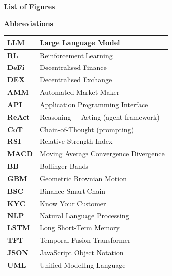 \documentclass[12pt,a4paper,oneside,openany]{book}
\begin{document}
\clearpage
\thispagestyle{empty}
\begin{center}
  {\fontsize{18}{22}\selectfont\bfseries List of Figures}
\end{center}
\vspace{8mm}
\makeatletter
{}
\makeatother
\thispagestyle{empty}

\clearpage
\thispagestyle{empty}
\begin{center}
  {\fontsize{16}{18}\selectfont\bfseries Abbreviations}\\[8mm]
\end{center}

\begin{center}
\renewcommand{\arraystretch}{1.2}
\setlength{\tabcolsep}{7pt}
\small

\begin{tabular}{|>{\centering\arraybackslash}p{2.2cm}|>{\centering\arraybackslash}p{8.5cm}|}
\hline
\textbf{LLM}  & Large Language Model \\ \hline
\textbf{RL}   & Reinforcement Learning \\ \hline
\textbf{DeFi} & Decentralised Finance \\ \hline
\textbf{DEX}  & Decentralised Exchange \\ \hline
\textbf{AMM}  & Automated Market Maker \\ \hline
\textbf{API}  & Application Programming Interface \\ \hline
\textbf{ReAct} & Reasoning + Acting (agent framework) \\ \hline
\textbf{CoT}  & Chain-of-Thought (prompting) \\ \hline
\textbf{RSI}  & Relative Strength Index \\ \hline
\textbf{MACD} & Moving Average Convergence Divergence \\ \hline
\textbf{BB}   & Bollinger Bands \\ \hline
\textbf{GBM}  & Geometric Brownian Motion \\ \hline
\textbf{BSC}  & Binance Smart Chain \\ \hline
\textbf{KYC}  & Know Your Customer \\ \hline
\textbf{NLP}  & Natural Language Processing \\ \hline
\textbf{LSTM} & Long Short-Term Memory \\ \hline
\textbf{TFT}  & Temporal Fusion Transformer \\ \hline
\textbf{JSON} & JavaScript Object Notation \\ \hline
\textbf{UML}  & Unified Modelling Language \\ \hline

\end{tabular}
\end{center}
\end{document}
